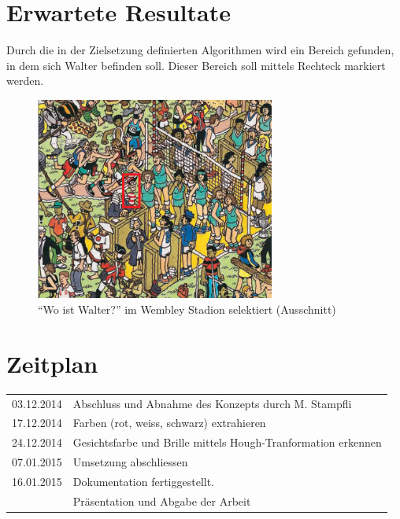 \documentclass[paper=a4,fontsize=12pt]{scrartcl}
\begin{document}
\section*{Erwartete Resultate}
Durch die in der Zielsetzung definierten Algorithmen wird ein Bereich gefunden, in dem sich Walter befinden soll. Dieser Bereich soll mittels Rechteck markiert werden.
\begin{figure}[htbp] 
  \centering
     \includegraphics[width=0.7\textwidth]{img/WallySelected.png}
  \caption{``Wo ist Walter?'' im Wembley Stadion selektiert (Ausschnitt)}
  \label{fig:Bild1}
\end{figure}


\section*{Zeitplan}
\begin{tabular}{rl}
    03.12.2014	&	Abschluss und Abnahme des Konzepts durch M. Stampfli \\
    17.12.2014	&	Farben (rot, weiss, schwarz) extrahieren \\
    24.12.2014	&	Gesichtsfarbe und Brille mittels Hough-Tranformation erkennen \\
    07.01.2015	&	Umsetzung abschliessen  \\
    16.01.2015	&	Dokumentation fertiggestellt.  \\
                &	Präsentation und Abgabe der Arbeit  \\
    
\end{tabular}
\end{document}
